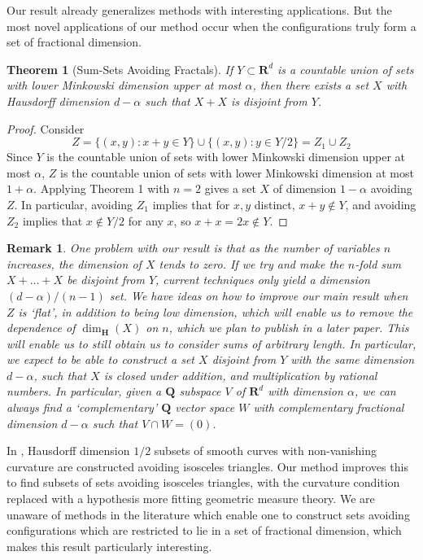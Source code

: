 \documentclass[usenames,dvipsnames]{article}
\theoremstyle{plain}
\theoremstyle{plain}
\newtheorem{theorem}{Theorem}
\newtheorem*{remark}{Remark}
\begin{document}
Our result already generalizes methods with interesting applications. But the most novel applications of our method occur when the configurations truly form a set of fractional dimension.

\begin{theorem}[Sum-Sets Avoiding Fractals]
	If $Y \subset \mathbf{R}^d$ is a countable union of sets with lower Minkowski dimension upper at most $\alpha$, then there exists a set $X$ with Hausdorff dimension $d-\alpha$ such that $X + X$ is disjoint from $Y$.
\end{theorem}
\begin{proof}
	Consider
	\[ Z = \{ (x,y): x + y \in Y \} \cup \{ (x,y): y \in Y/2 \} = Z_1 \cup Z_2 \]
	Since $Y$ is the countable union of sets with lower Minkowski dimension upper at most $\alpha$, $Z$ is the countable union of sets with lower Minkowski dimension at most $1 + \alpha$. Applying Theorem 1 with $n = 2$ gives a set $X$ of dimension $1 - \alpha$ avoiding $Z$. In particular, avoiding $Z_1$ implies that for $x,y$ distinct, $x + y \not \in Y$, and avoiding $Z_2$ implies that $x \not \in Y/2$ for any $x$, so $x + x = 2x \not \in Y$.
\end{proof}

\begin{remark}
	One problem with our result is that as the number of variables $n$ increases, the dimension of $X$ tends to zero. If we try and make the $n$-fold sum $X + \dots + X$ be disjoint from $Y$, current techniques only yield a dimension $(d - \alpha)/(n-1)$ set. We have ideas on how to improve our main result when $Z$ is `flat', in addition to being low dimension, which will enable us to remove the dependence of $\dim_{\mathbf{H}}(X)$ on $n$, which we plan to publish in a later paper. This will enable us to still obtain us to consider sums of arbitrary length. In particular, we expect to be able to construct a set $X$ disjoint from $Y$ with the same dimension $d - \alpha$, such that $X$ is closed under addition, and multiplication by rational numbers. In particular, given a $\mathbf{Q}$ subspace $V$ of $\mathbf{R}^d$ with dimension $\alpha$, we can always find a `complementary' $\mathbf{Q}$ vector space $W$ with complementary fractional dimension $d - \alpha$ such that $V \cap W = (0)$.
\end{remark}

In \cite{MalabikaRob}, Hausdorff dimension $1/2$ subsets of smooth curves with non-vanishing curvature are constructed avoiding isosceles triangles. Our method improves this to find subsets of sets avoiding isosceles triangles, with the curvature condition replaced with a hypothesis more fitting geometric measure theory. We are unaware of methods in the literature which enable one to construct sets avoiding configurations which are restricted to lie in a set of fractional dimension, which makes this result particularly interesting.
\end{document}
